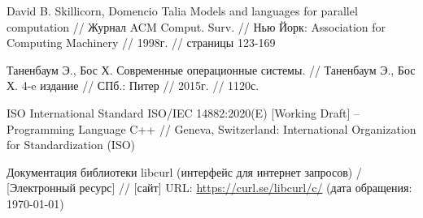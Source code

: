 \begin{thebibliography}{}
   David B. Skillicorn, Domencio Talia Models and languages for parallel computation // Журнал ACM Comput. Surv. // Нью Йорк: Association for Computing Machinery // 1998г. // страницы 123-169
  
   Таненбаум Э., Бос Х. Современные операционные системы. // Таненбаум Э., Бос Х. 4-e издание // СПб.: Питер // 2015г. // 1120с.
  
   ISO International Standard ISO/IEC 14882:2020(E) [Working Draft] – Programming Language C++ // Geneva, Switzerland: International Organization for Standardization (ISO)

   Документация библиотеки libcurl (интерфейс для интернет запросов) / [Электронный ресурс] // [сайт] URL: \url{https://curl.se/libcurl/c/} (дата обращения: \today)
\end{thebibliography}